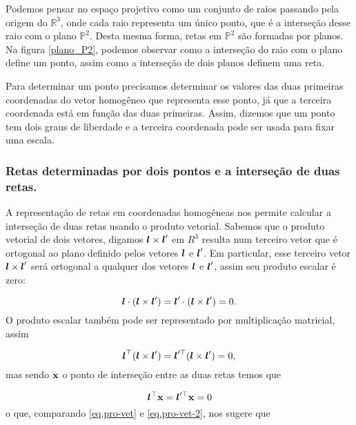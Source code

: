 Podemos pensar no espaço projetivo como um conjunto de raios passando pela origem do $\mathbb{R}^3$, onde cada raio representa um único ponto, que é a interseção desse raio com o plano $\mathbb{P}^2$. Desta mesma forma, retas em $\mathbb{P}^2$ são formadas por planos. Na figura \ref{plano_P2}, podemos observar como a interseção do raio com o plano define um ponto, assim como a interseção de dois planos definem uma reta.


Para determinar um ponto precisamos determinar os valores das duas primeiras coordenadas do vetor homogêneo que representa esse ponto, já que a terceira coordenada está em função das duas primeiras. Assim, dizemos que um ponto tem dois graus de liberdade e a terceira coordenada pode ser usada para fixar uma escala.
\\

\subsubsection{Retas determinadas por dois pontos e a interseção de duas retas.}

A representação de retas em coordenadas homogêneas nos permite calcular a interseção de duas retas usando o produto vetorial. Sabemos que o produto vetorial de dois vetores, digamos $\boldsymbol{l}\times\boldsymbol{l}'$ em $R^3$ resulta num terceiro vetor que é ortogonal ao plano definido pelos vetores $\boldsymbol{l}$ e $\boldsymbol{l}'$. Em particular, esse terceiro vetor $\boldsymbol{l}\times\boldsymbol{l}'$ será ortogonal a qualquer dos vetores $\boldsymbol{l}$ e $\boldsymbol{l}'$, assim seu produto escalar é zero:

\begin{equation*}
\boldsymbol{l}\cdot(\boldsymbol{l}\times\boldsymbol{l}')=\boldsymbol{l}'\cdot(\boldsymbol{l}\times\boldsymbol{l}')=0.
\end{equation*}
O produto escalar também pode ser representado por multiplicação matricial, assim

\begin{equation}\label{eq.pro-vet}
\boldsymbol{l}^\top(\boldsymbol{l}\times\boldsymbol{l}')=\boldsymbol{l}'^\top(\boldsymbol{l}\times\boldsymbol{l}')=0,
\end{equation}
mas sendo $\mathbf{x}$ o ponto de interseção entre as duas retas temos que

\begin{equation}\label{eq.pro-vet-2}
\boldsymbol{l}^\top\mathbf{x}=\boldsymbol{l}'^\top\mathbf{x}=0
\end{equation}
o que, comparando \ref{eq.pro-vet} e \ref{eq.pro-vet-2}, nos sugere que

